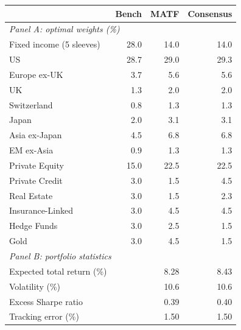 %

			\begin{tabular}{l rrr}
				\toprule
				& \textbf{Bench} & \textbf{MATF} & \textbf{Consensus} \\
				\midrule
				\multicolumn{4}{l}{\textit{Panel A: optimal weights (\%)}} \\
				Fixed income (5 sleeves)  & 28.0 & 14.0 & 14.0 \\
				US                        & 28.7 & 29.0 & 29.3 \\
				Europe ex-UK              & 3.7 & 5.6 & 5.6 \\
				UK                        & 1.3 & 2.0 & 2.0 \\
				Switzerland               & 0.8 & 1.3 & 1.3 \\
				Japan                     & 2.0 & 3.1 & 3.1 \\
				Asia ex-Japan             & 4.5 & 6.8 & 6.8 \\
				EM ex-Asia                & 0.9 & 1.3 & 1.3 \\
				Private Equity            & 15.0 & 22.5 & 22.5 \\
				Private Credit            & 3.0 & 1.5 & 4.5 \\
				Real Estate               & 3.0 & 1.5 & 2.3 \\
				Insurance-Linked          & 3.0 & 4.5 & 4.5 \\
				Hedge Funds               & 3.0 & 2.5 & 1.5 \\
				Gold                      & 3.0 & 4.5 & 1.5 \\
				\midrule
				\multicolumn{4}{l}{\textit{Panel B: portfolio statistics}} \\
				Expected total return (\%)  & & 8.28 & 8.43 \\
				Volatility (\%)             & & 10.6 & 10.6 \\
				Excess Sharpe ratio         & & 0.39 & 0.40 \\
				Tracking error (\%)         & & 1.50 & 1.50 \\
				\bottomrule
			\end{tabular}
